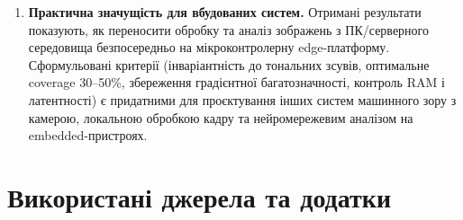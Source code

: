 \documentclass[a4paper,12pt]{article}
\let\oldsection\section
\renewcommand{\section}{\clearpage\oldsection}
\begin{document}
\begin{enumerate}
	\item \textbf{Практична значущість для вбудованих систем.} Отримані результати показують, як переносити обробку та аналіз зображень з ПК/серверного середовища безпосередньо на мікроконтролерну edge-платформу. Сформульовані критерії (інваріантність до тональних зсувів, оптимальне coverage 30--50\%, збереження градієнтної багатозначності, контроль RAM і латентності) є придатними для проєктування інших систем машинного зору з камерою, локальною обробкою кадру та нейромережевим аналізом на embedded-пристроях.
\end{enumerate}

\newpage
\section*{Використані джерела та додатки}
\end{document}
